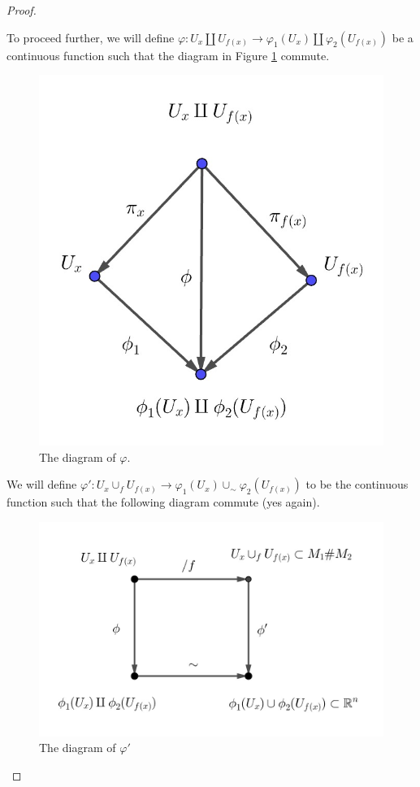 \documentclass[12pt, a4paper]{article}
\theoremstyle{plain}
\def\phi{\varphi}
\begin{document}
\begin{proof}
\begin{enumerate}[label=(\alph*)]
            To proceed further, we will define $\phi: U_x\amalg U_{f(x)}\to \phi_1(U_x)\amalg \phi_2(U_{f(x)})$ be a continuous function such that the diagram in Figure \ref{fig:3} commute.
            \begin{figure}[H]
                \centering
                \includegraphics[scale=0.3]{Topology-Lee/image3.jpg}
                \caption{The diagram of $\phi$.}
                \label{fig:3}
            \end{figure}
            We will define $\phi' \colon U_x\cup_f U_{f(x)} \to \phi_1(U_x)\cup_\sim \phi_2(U_{f(x)})$ to be the continuous function such that the following diagram commute (yes again).
            \begin{figure}[H]
                \centering
                \includegraphics[scale = 0.3]{Topology-Lee/image4.jpg}
                \caption{The diagram of $\phi'$}
                \label{fig:4}
            \end{figure}


\end{enumerate}
\end{proof}
\end{document}
